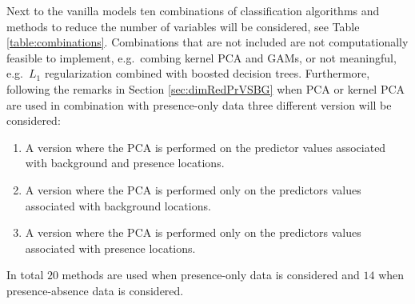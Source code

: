 Next to the vanilla models ten combinations of classification algorithms and methods to reduce the number of variables will be considered, see Table \ref{table:combinations}. Combinations that are not included are not computationally feasible to implement, e.g.\ combing kernel PCA and GAMs, or not meaningful, e.g.\ $L_1$ regularization combined with boosted decision trees. Furthermore, following the remarks in Section \ref{sec:dimRedPrVSBG} when PCA or kernel PCA are used in combination with presence-only data three different version will be considered: \begin{enumerate}
\item A version where the PCA is performed on the predictor values associated with background and presence locations.
\item A version where the PCA is performed only on the predictors values associated with background locations.
\item A version where the PCA is performed only on the predictors values associated with presence locations.
\end{enumerate}
In total $20$ methods are used when presence-only data is considered and $14$ when presence-absence data is considered. \\


\begin{table}[!htb]
\caption{\label{table:combinations}Table with the combinations of classification and dimensionality reduction techniques that are considered.}
\end{table}


